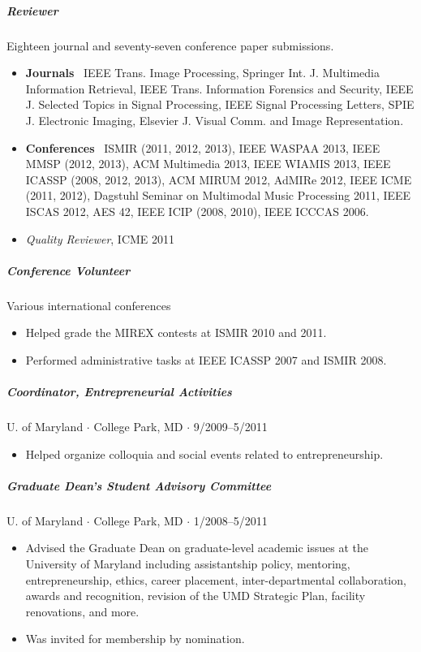 \documentclass[10pt,letterpaper]{article}
\begin{document}
\subparagraph{Reviewer} Eighteen journal and seventy-seven conference paper submissions. 
\begin{itemize}
\item \textbf{Journals} \ 
    IEEE Trans. Image Processing, %
    Springer Int. J. Multimedia Information Retrieval, %
    IEEE Trans. Information Forensics and Security, %
    IEEE J. Selected Topics in Signal Processing, %
    IEEE Signal Processing Letters, %
    SPIE J. Electronic Imaging, %
    Elsevier J. Visual Comm. and Image Representation. %
\item \textbf{Conferences} \ 
    ISMIR (2011, 2012, 2013), %
    IEEE WASPAA 2013, %
    IEEE MMSP (2012, 2013), %
    ACM Multimedia 2013, %
    IEEE WIAMIS 2013, %
    IEEE ICASSP (2008, 2012, 2013), %
    ACM MIRUM 2012, %
    AdMIRe 2012, %
    IEEE ICME (2011, 2012), %
    Dagstuhl Seminar on Multimodal Music Processing 2011, %
    IEEE ISCAS 2012, %
    AES 42, %
    IEEE ICIP (2008, 2010), %
    IEEE ICCCAS 2006. %
\item \textit{Quality Reviewer}, ICME 2011
\end{itemize}

\subparagraph{Conference Volunteer}
Various international conferences
\begin{itemize}
\item Helped grade the MIREX contests at ISMIR 2010 and 2011.
\item Performed administrative tasks at IEEE ICASSP 2007 and ISMIR 2008.
\end{itemize}

\subparagraph{Coordinator, Entrepreneurial Activities}
U. of Maryland $\cdot$ College Park, MD $\cdot$ 9/2009--5/2011
\begin{itemize}
\item Helped organize colloquia and social events related to entrepreneurship.
\end{itemize}

\subparagraph{Graduate Dean's Student Advisory Committee}
U. of Maryland $\cdot$ College Park, MD $\cdot$ 1/2008--5/2011
\begin{itemize}
\item Advised the Graduate Dean on graduate-level academic issues at the University of Maryland including assistantship policy, mentoring, entrepreneurship, ethics, career placement, inter-departmental collaboration, awards and recognition, revision of the UMD Strategic Plan, facility renovations, and more.
\item Was invited for membership by nomination.
\end{itemize}
\end{document}
